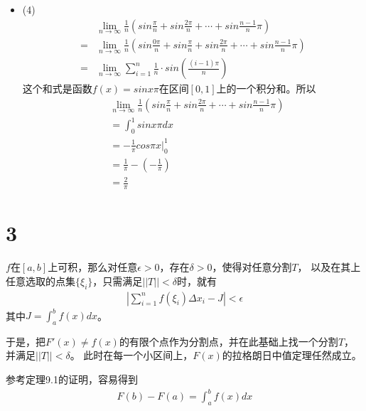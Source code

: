 \documentclass{article}
\begin{document}
\begin{itemize}
  \item (4)
        \begin{align*}
            & \lim \limits_{n \to \infty} \frac{1}{n} (sin \frac{\pi}{n} + sin \frac{2\pi}{n} + \cdots + sin \frac{n-1}{n}\pi)                       \\
          = & \lim \limits_{n \to \infty} \frac{1}{n} (sin \frac{0 \pi}{n} + sin \frac{\pi}{n} + sin \frac{2\pi}{n} + \cdots + sin \frac{n-1}{n}\pi) \\
          = & \lim \limits_{n \to \infty} \sum \limits_{i = 1}^{n} \frac{1}{n} \cdot sin \left(\frac{(i - 1)\pi}{n}\right)
        \end{align*}
        这个和式是函数$f(x) = sin x \pi$在区间$[0, 1]$上的一个积分和。所以
        \begin{align*}
           & \lim \limits_{n \to \infty} \frac{1}{n} (sin \frac{\pi}{n} + sin \frac{2\pi}{n} + \cdots + sin \frac{n-1}{n}\pi) \\
           & = \int_{0}^{1} sin x \pi dx                                                                                      \\
           & = - \frac{1}{\pi} cos \pi x \bigg|_0^1                                                                           \\
           & = \frac{1}{\pi} - (- \frac{1}{\pi})                                                                              \\
           & = \frac{2}{\pi}
        \end{align*}
\end{itemize}

\section*{3}

$f$在$[a,b]$上可积，那么对任意$\epsilon > 0$，存在$\delta > 0$，使得对任意分割$T$，
以及在其上任意选取的点集$\{\xi_i\}$，只需满足$||T|| < \delta$时，就有
\begin{align*}
  \left| \sum\limits_{i=1}^n f(\xi_i) \Delta x_i - J \right| < \epsilon
\end{align*}
其中$J = \int_a^b f(x) dx$。

于是，把$F'(x) \neq f(x)$的有限个点作为分割点，并在此基础上找一个分割$T$，并满足$||T|| < \delta$。
此时在每一个小区间上，$F(x)$的拉格朗日中值定理任然成立。

参考定理9.1的证明，容易得到
\begin{align*}
  F(b) - F(a) = \int_a^b f(x) dx
\end{align*}
\end{document}
